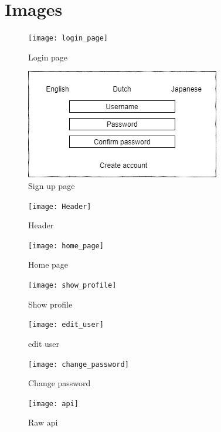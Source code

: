 \documentclass{article}
\begin{document}
\pagebreak

\section{Images}

\begin{figure}[!h]
    \centering
    \texttt{[image: login\_page]}
    \caption{Login page}
    \label{fig:login page}
\end{figure}

\begin{figure}[!h]
	\centering
	\includegraphics{createUser}
	\caption{Sign up page}
	\label{fig:create user page}
\end{figure}

\begin{figure}[!h]
    \centering
    \texttt{[image: Header]}
    \caption{Header}
    \label{fig:header}
\end{figure}

\begin{figure}[!h]
    \centering
    \texttt{[image: home\_page]}
    \caption{Home page}
    \label{fig:home page}
\end{figure}

\begin{figure}[!h]
    \centering
    \texttt{[image: show\_profile]}
    \caption{Show profile}
    \label{fig:show_profile}
\end{figure}

\begin{figure}[!h]
    \centering
    \texttt{[image: edit\_user]}
    \caption{edit user}
    \label{fig:edit profile}
\end{figure}

\begin{figure}[!h]
    \centering
    \texttt{[image: change\_password]}
    \caption{Change password}
    \label{fig:Change password}
\end{figure}

\begin{figure}[!h]
    \centering
    \texttt{[image: api]}
    \caption{Raw api}
    \label{fig:raw api}
\end{figure}
\end{document}
